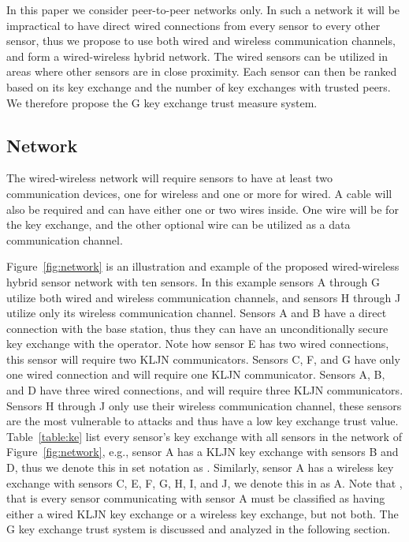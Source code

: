 \documentclass{ws-fnl2}
\begin{document}
In this paper we consider peer-to-peer networks only. In such a network it will be impractical to have direct wired connections from every sensor to every other sensor, thus we propose to use both wired and wireless communication channels, and form a wired-wireless hybrid network. The wired sensors can be utilized in areas where other sensors are in close proximity. Each sensor can then be ranked based on its key exchange and the number of key exchanges with trusted peers. We therefore propose the G key exchange trust measure system. 


\subsection{Network}

The wired-wireless network will require sensors to have at least two communication devices, one for wireless and one or more for wired. A cable will also be required and can have either one or two wires inside. One wire will be for the key exchange, and the other optional wire can be utilized as a data communication channel. 

Figure~\ref{fig:network} is an illustration and example of the proposed wired-wireless hybrid sensor network with ten sensors. In this example sensors A through G utilize both wired and wireless communication channels, and sensors H through J utilize only its wireless communication channel. Sensors A and B have a direct connection with the base station, thus they can have an unconditionally secure key exchange with the operator. Note how sensor E has two wired connections, this sensor will require two KLJN communicators. Sensors C, F, and G have only one wired connection and will require one KLJN communicator. Sensors A, B, and D have three wired connections, and will require three KLJN communicators. Sensors H through J only use their wireless communication channel, these sensors are the most vulnerable to attacks and thus have a low key exchange trust value. Table~\ref{table:ke} list every sensor's key exchange with all sensors in the network of Figure~\ref{fig:network}, e.g., sensor A has a KLJN key exchange with sensors B and D, thus we denote this in set notation as . Similarly, sensor A has a wireless key exchange with sensors C, E, F, G, H, I, and J, we denote this in as A. Note that , that is every sensor communicating with sensor A must be classified as having either a wired KLJN key exchange or a wireless key exchange, but not both. The G key exchange trust system is discussed and analyzed in the following section.
\end{document}

